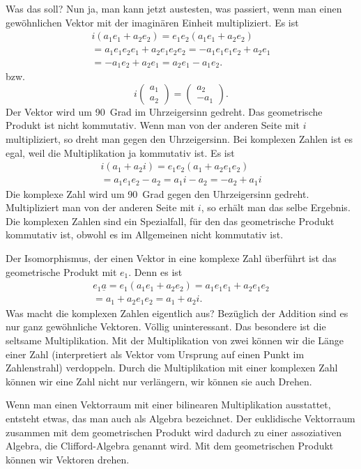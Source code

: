 \documentclass[a4paper,10pt,fleqn,twocolumn,twoside]{article}
\begin{document}
Was das soll? Nun ja, man kann jetzt austesten, was passiert,
wenn man einen gewöhnlichen Vektor mit der imaginären Einheit
multipliziert. Es ist
\begin{gather*}
i(a_1e_1+a_2e_2) = e_1e_2(a_1e_1+a_2e_2)\\
= a_1e_1e_2e_1+a_2e_1e_2e_2 = -a_1e_1e_1e_2+a_2e_1\\
= -a_1e_2+a_2e_1 = a_2e_1-a_1e_2.
\end{gather*}
\noindent
bzw.
\[i\begin{pmatrix}a_1\\ a_2\end{pmatrix}
= \begin{pmatrix}a_2\\ -a_1\end{pmatrix}.\]
\noindent
Der Vektor wird um 90~Grad im Uhrzeigersinn gedreht. Das geometrische
Produkt ist nicht kommutativ. Wenn man von der anderen Seite mit \(i\)
multipliziert, so dreht man gegen den Uhrzeigersinn. Bei komplexen
Zahlen ist es egal, weil die Multiplikation ja kommutativ ist. Es ist
\begin{gather*}
i(a_1+a_2i) = e_1e_2(a_1+a_2e_1e_2)\\
= a_1e_1e_2-a_2 = a_1i-a_2 = -a_2+a_1i
\end{gather*}
\noindent
Die komplexe Zahl wird um 90~Grad gegen den Uhrzeigersinn gedreht.
Multipliziert man von der anderen Seite mit \(i\), so erhält man das
selbe Ergebnis. Die komplexen Zahlen sind ein Spezialfall, für den
das geometrische Produkt kommutativ ist, obwohl es im Allgemeinen
nicht kommutativ ist.

Der Isomorphismus, der einen Vektor in eine komplexe Zahl überführt
ist das geometrische Produkt mit \(e_1\). Denn es ist
\begin{gather*}
e_1\underline a = e_1(a_1e_1+a_2e_2) = a_1e_1e_1 + a_2e_1e_2\\
= a_1 + a_2e_1e_2 = a_1+a_2i.
\end{gather*}
\noindent
Was macht die komplexen Zahlen eigentlich aus? Bezüglich der Addition
sind es nur ganz gewöhnliche Vektoren. Völlig uninteressant.
Das besondere ist die seltsame Multiplikation. Mit der Multiplikation
von zwei können wir die Länge einer Zahl (interpretiert als Vektor vom
Ursprung auf einen Punkt im Zahlenstrahl) verdoppeln. Durch die Multiplikation
mit einer komplexen Zahl können wir eine Zahl nicht nur verlängern,
wir können sie auch Drehen.

Wenn man einen Vektorraum mit einer bilinearen Multiplikation
ausstattet, entsteht etwas, das man auch als Algebra bezeichnet.
Der euklidische Vektorraum zusammen mit dem geometrischen Produkt
wird dadurch zu einer assoziativen Algebra, die Clifford-Algebra
genannt wird. Mit dem geometrischen Produkt können wir Vektoren
drehen.
\end{document}

